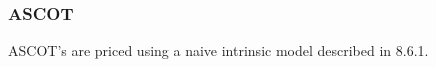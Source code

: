 \subsubsection{ASCOT}
\label{pricing::ascot}

ASCOT's are priced using a naive intrinsic model described in \cite{Spiegeleer_convertible_handbook} 8.6.1.

